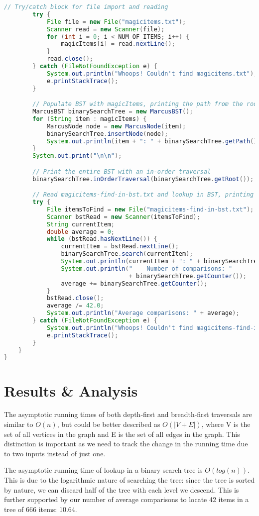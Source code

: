 \documentclass[letterpaper, 10pt]{article}
\begin{document}
\begin{lstlisting}[language=Java]
        // Try/catch block for file import and reading
        try {
            File file = new File("magicitems.txt");
            Scanner read = new Scanner(file);
            for (int i = 0; i < NUM_OF_ITEMS; i++) {
                magicItems[i] = read.nextLine();
            }
            read.close();
        } catch (FileNotFoundException e) {
            System.out.println("Whoops! Couldn't find magicitems.txt");
            e.printStackTrace();
        }

        // Populate BST with magicItems, printing the path from the root
        MarcusBST binarySearchTree = new MarcusBST();
        for (String item : magicItems) {
            MarcusNode node = new MarcusNode(item);
            binarySearchTree.insertNode(node);
            System.out.println(item + ": " + binarySearchTree.getPath());
        }
        System.out.print("\n\n");

        // Print the entire BST with an in-order traversal
        binarySearchTree.inOrderTraversal(binarySearchTree.getRoot());

        // Read magicitems-find-in-bst.txt and lookup in BST, printing path
        try {
            File itemsToFind = new File("magicitems-find-in-bst.txt");
            Scanner bstRead = new Scanner(itemsToFind);
            String currentItem;
            double average = 0;
            while (bstRead.hasNextLine()) {
                currentItem = bstRead.nextLine();
                binarySearchTree.search(currentItem);
                System.out.println(currentItem + ": " + binarySearchTree.getPath());
                System.out.println("    Number of comparisons: "
                                   + binarySearchTree.getCounter());
                average += binarySearchTree.getCounter();
            }
            bstRead.close();
            average /= 42.0;
            System.out.println("Average comparisons: " + average);
        } catch (FileNotFoundException e) {
            System.out.println("Whoops! Couldn't find magicitems-find-in-bst.txt");
            e.printStackTrace();
        }
    }
}
\end{lstlisting}

\section{Results \& Analysis}

\hspace{1.0em}The asymptotic running times of both depth-first and breadth-first traversals are similar to $O(n)$, but could be better described as $O(|V+E|)$, where V is the set of all vertices in the graph and E is the set of all edges in the graph. This distinction is important as we need to track the change in the running time due to two inputs instead of just one.

\hspace{1.0em}The asymptotic running time of lookup in a binary search tree is $O(log(n))$. This is due to the logarithmic nature of searching the tree: since the tree is sorted by nature, we can discard half of the tree with each level we descend. This is further supported by our number of average comparisons to locate 42 items in a tree of 666 items: 10.64.
\end{document}
